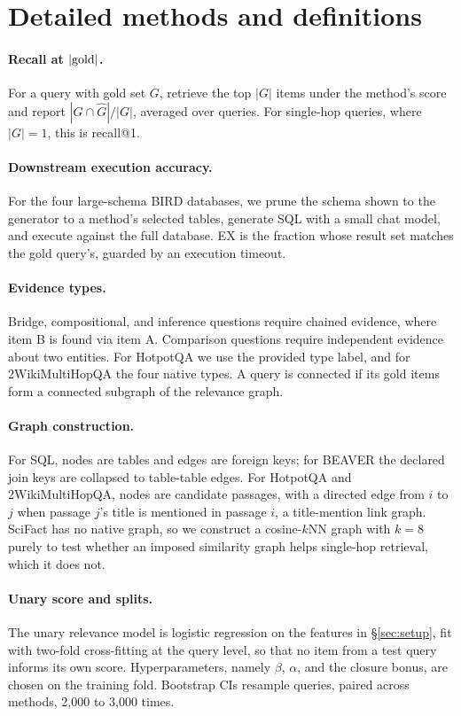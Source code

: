 \documentclass[11pt]{article}
\begin{document}
\appendix
\section{Detailed methods and definitions}\label{app:methods}

\paragraph{Recall at $|{\rm gold}|$.} For a query with gold set $G$, retrieve the top $|G|$ items under
the method's score and report $|G \cap \widehat{G}|/|G|$, averaged over queries. For single-hop queries,
where $|G|\!=\!1$, this is recall@1.

\paragraph{Downstream execution accuracy.} For the four large-schema BIRD databases, we prune the schema
shown to the generator to a method's selected tables, generate SQL with a small chat model, and execute
against the full database. EX is the fraction whose result set matches the gold query's, guarded by an
execution timeout.

\paragraph{Evidence types.} Bridge, compositional, and inference questions require chained evidence,
where item B is found via item A. Comparison questions require independent evidence about two entities.
For HotpotQA we use the provided type label, and for 2WikiMultiHopQA the four native types. A query is
connected if its gold items form a connected subgraph of the relevance graph.

\paragraph{Graph construction.} For SQL, nodes are tables and edges are foreign keys; for BEAVER the
declared join keys are collapsed to table-table edges. For HotpotQA and 2WikiMultiHopQA, nodes are
candidate passages, with a directed edge from $i$ to $j$ when passage $j$'s title is mentioned in
passage $i$, a title-mention link graph. SciFact has no native graph, so we construct a cosine-$k$NN
graph with $k\!=\!8$ purely to test whether an imposed similarity graph helps single-hop retrieval,
which it does not.

\paragraph{Unary score and splits.} The unary relevance model is logistic regression on the features in
\S\ref{sec:setup}, fit with two-fold cross-fitting at the query level, so that no item from a test query
informs its own score. Hyperparameters, namely $\beta$, $\alpha$, and the closure bonus, are chosen on
the training fold. Bootstrap CIs resample queries, paired across methods, 2{,}000 to 3{,}000 times.
\end{document}
